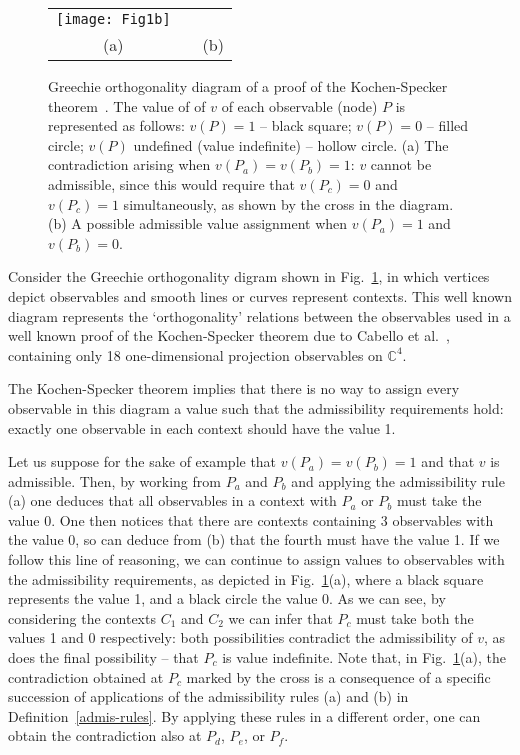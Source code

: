 \documentclass[%
 superscriptaddress,
 preprint,
 showpacs,
 showkeys,
 nofootinbib,
  amsmath,amssymb,
  aps,
  longbibliography,
  floatfix,
 ]{revtex4-1}
\theoremstyle{definition}
\newcommand{\C}{\mathbb{C}}
\begin{document}
\begin{figure}
\begin{center}
\begin{tabular}{ccc}
\begin{tikzpicture}  [scale=0.6]

		\end{tikzpicture}
		\fi
		\texttt{[image: Fig1b]}
		\\
		(a) & & (b)\\
	\end{tabular}
	\end{center}
	\caption{Greechie orthogonality diagram of a proof of the Kochen-Specker theorem~\cite{Cabello:1996zr}.
			The value of of $v$ of each observable (node) $P$ is represented as follows: $v(P)=1$ -- black square; $v(P)=0$ -- filled circle; $v(P)$ undefined (value indefinite) -- hollow circle.
			(a) The contradiction arising when $v(P_a)=v(P_b)=1$: $v$ cannot be admissible, since this would require that $v(P_c)=0$ and $v(P_c)=1$ simultaneously, as shown by the cross in the diagram.
			(b) A possible admissible value assignment when $v(P_a)=1$ and $v(P_b)=0$.}
	\label{fig:Cabello}
\end{figure}

Consider the Greechie orthogonality digram shown in Fig.~\ref{fig:Cabello}, in which vertices depict observables and smooth lines or curves represent contexts.
This well known diagram represents the `orthogonality' relations between the observables used in a well known proof of the Kochen-Specker theorem due to Cabello et al.~\cite{Cabello:1996zr}, containing only 18 {\color{blue} one-dimensional} projection observables on $\C^4$.

The Kochen-Specker theorem implies that there is no way to assign every observable in this diagram a value such that the admissibility requirements hold: exactly one observable in each context should have the value 1.

Let us suppose for the sake of example that $v(P_a)=v(P_b)=1$ and that $v$ is admissible.
Then, by working from $P_a$ and $P_b$ and applying the admissibility rule (a) one deduces that all observables in a context with $P_a$ or $P_b$ must take the value 0.
One then notices that there are contexts containing 3 observables with the value 0, so can deduce from (b) that the fourth must have the value 1.
If we follow this line of reasoning, we can continue to assign values to observables with the admissibility requirements, as depicted in Fig.~\ref{fig:Cabello}(a), where a black square represents the value 1, and a black circle the value 0.
As we can see, by considering the contexts $C_1$ and $C_2$ we can infer that $P_c$ must take both the values 1 and 0 respectively: both possibilities contradict the admissibility of $v$, as does the final possibility -- that $P_c$ is value indefinite.
Note that, in Fig.~\ref{fig:Cabello}(a), the contradiction obtained at $P_c$ marked by the cross is a consequence of a specific succession of applications of the admissibility rules (a) and (b) in Definition~\ref{admis-rules}.
By applying these rules in a different order, one can obtain the contradiction also at $P_d$, $P_e$, or $P_f$.
\end{document}
